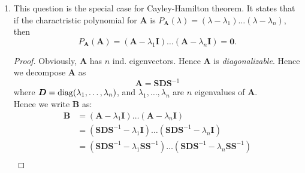 \begin{enumerate}
\begin{proof}[Solution.]
\begin{enumerate}
\item
$\bm A\bm x=\lambda\bm x\implies(\bm A-\lambda\bm I)\bm x=\bm 0.$ Since $\lambda=0$, we only need to investigate the dimension for $\bm x$, where $\bm{Ax}=\bm 0.$\\
Since $\bm A=\bm x\bm y\trans$, $\rank(\bm A)=1$. Hence $\dim(N(\bm A))=n-1$. So the eigenspace for $\lambda$  is $n-1$ dimension.\\
Thus $\lambda=0$ is an eigenvalue of $\bm A$ with $n-1$ ind. eigenvectors.
\item
By part (a), 
\[
\lambda_1=\lambda_2=\dots=\lambda_{n-1}=0.
\]
The sum of the eigenvalues is the trace of $\bm A$ which equals to $\bm x\trans\bm y$. Thus
\[
\sum_{i=1}^{n}\lambda_i=\lambda_n=\trace(\bm A)=\bm x\trans\bm y.
\]
Hence the remaining eigenvalue of $\bm A$ is $\lambda_n=\trace(\bm A)=\bm x\trans\bm y.$
\item
From part(a) $\lambda=0$ has $n-1$ ind. eigenvectors.\\
Since $\lambda_n\ne0$, the eigenvector associated to $\lambda_n$ will be independent from the $n-1$ eigenvectors.(A theorem says if eigenvalues $\lambda_1,\dots,\lambda_k$ are distinct, their corresponding eigenvectors $\bm x_1,\dots,\bm x_k$ will be ind.)\\ Hence $\bm A$ has $n$ ind. eigenvectors, $\bm A$ is diagonalizable.
\end{enumerate}
\end{proof}
\item
This question is the special case for Cayley-Hamilton theorem. It states that if the charactristic polynomial for $\bm A$ is $P_{\bm A}(\lambda)=(\lambda-\lambda_1)\dots(\lambda-\lambda_n)$, then \[P_{\bm A}(\bm A)=(\bm A-\lambda_1\bm I)\dots(\bm A-\lambda_n\bm I)=\bm0.\]
\begin{proof}
Obviously, $\bm A$ has $n$ ind. eigenvectors. Hence $\bm A$ is \textit{diagonalizable}. Hence we decompose $\bm A$ as
\[
\bm A=\bm S\bm D\bm S^{-1}
\]
where $\bm D=\operatorname{diag}(\lambda_1,\dots,\lambda_n)$, and $\lambda_1,\dots,\lambda_n$ are $n$ eigenvalues of $\bm A$.\\
Hence we write $\bm B$ as:
\begin{align*}
\bm B&=(\bm A-\lambda_1\bm I)\dots(\bm A-\lambda_n\bm I)\\
&=(\bm S\bm D\bm S^{-1}-\lambda_1\bm I)\dots(\bm S\bm D\bm S^{-1}-\lambda_n\bm I)\\
&=(\bm S\bm D\bm S^{-1}-\lambda_1\bm S\bm S^{-1})\dots(\bm S\bm D\bm S^{-1}-\lambda_n\bm S\bm S^{-1})\\

\end{align*}
\end{proof}
\end{enumerate}

